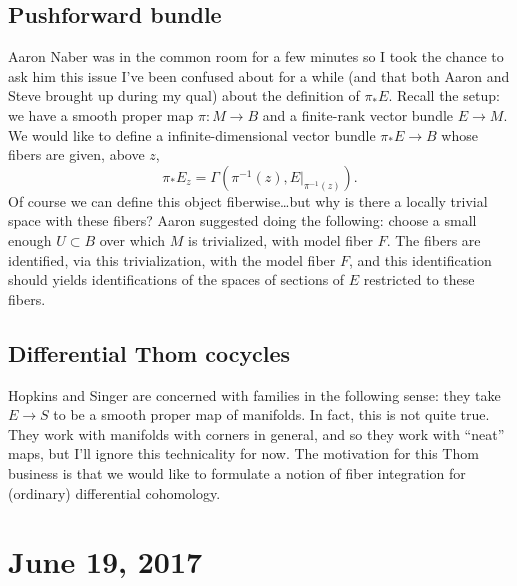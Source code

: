 \documentclass{amsart}
\begin{document}
\subsection{Pushforward bundle}
Aaron Naber was in the common room for a few minutes so I took the chance to ask
him this issue I've been confused about for a while (and that both Aaron and Steve
brought up during my qual) about the definition of $\pi_*E$. Recall the setup: we have a
smooth proper map $\pi:M\to B$ and a finite-rank vector bundle $E\to M$. We would
like to define a infinite-dimensional vector bundle $\pi_*E\to B$ whose fibers
are given, above $z$,
\begin{equation*}
    {\pi_*E}_z = \Gamma(\pi^{-1}(z), E|_{\pi^{-1}(z)}).
\end{equation*}
Of course we can define this object fiberwise\ldots but why is there a locally
trivial space with these fibers? Aaron suggested doing the following: choose a
small enough $U\subset B$ over which $M$ is trivialized, with model fiber $F$.
The fibers are identified, via this trivialization, with the model fiber $F$,
and this identification should yields identifications of the spaces of sections
of $E$ restricted to these fibers.

\subsection{Differential Thom cocycles}
Hopkins and Singer are concerned with families in the following sense: they
take $E\to S$ to be a smooth proper map of manifolds. In fact, this is not quite
true. They work with manifolds with corners in general, and so they work with
``neat'' maps, but I'll ignore this technicality for now. The motivation for
this Thom business is that we would like to formulate a notion of fiber integration
for (ordinary) differential cohomology.

\section{June 19, 2017}
\end{document}
